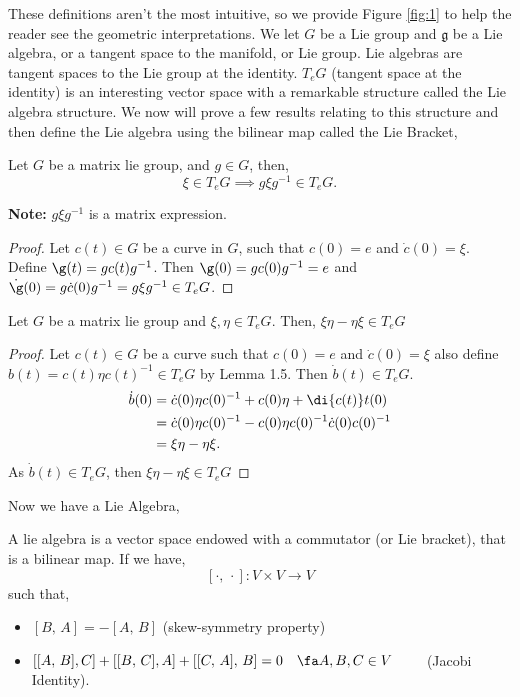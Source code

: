 \noindent
These definitions aren't the most intuitive, so we provide Figure \ref{fig:1} to help the reader see the geometric interpretations. We let $G$ be a Lie group and $\mathfrak{g}$ be a Lie algebra, or a tangent space to the manifold, or Lie group. Lie algebras are tangent spaces to the Lie group at the identity. $T_e G$ (tangent space at the identity) is an interesting vector space with a remarkable structure called the Lie algebra structure. We now will prove a few results relating to this structure and then define the Lie algebra using the bilinear map called the Lie Bracket,

\begin{nlemma}\label{lemma:comm}
  Let $G$ be a matrix lie group, and $g \in G$, then,
  $$ \xi \in T_eG \implies g\xi g^{-1} \in T_eG. $$
\end{nlemma}
\noindent
\textbf{Note:} $g \xi g^{-1}$ is a matrix expression.\\

\begin{proof}
  Let $c(t) \in G$ be a curve in $G$, such that $c(0) = e$ and $\dot c (0) = \xi$. Define $\g (t) = gc(t)g^{-1}$. Then $\g(0) = g c(0) g^{-1} = e$ and $\dot\g (0) = g \dot c (0) g^{-1} = g\xi g^{-1} \in T_e G$.
\end{proof}

\begin{nprop}
  Let $G$ be a matrix lie group and $\xi, \eta \in T_eG$. Then, $\xi\eta - \eta\xi \in T_eG$
\end{nprop}
\begin{proof}
  Let $c(t) \in G$ be a curve such that $c(0) = e$ and $\dot c(0) = \xi$ also define $b(t) = c(t)\eta c(t)^{-1} \in T_eG$ by Lemma 1.5. Then $\dot b(t) \in T_eG$.
  \begin{align*}
    \dot b(0) &= \dot c(0)\eta c(0)^{-1} + c(0)\eta + \di {c(t)} t (0)\\
    &= \dot c(0)\eta c(0)^{-1} - c(0)\eta c(0)^{-1}\dot c(0) c(0)^{-1}\\
    &= \xi \eta - \eta\xi.
  \end{align*}
  As $\dot b(t) \in T_eG$, then $\xi \eta - \eta\xi \in T_eG$
\end{proof}

\noindent
Now we have a Lie Algebra,
\begin{ndefi}
  A lie algebra is a vector space endowed with a {commutator }(or Lie bracket), that is a bilinear map. If we have,
  $$ [\cdot,\, \cdot] : V \times V \to V $$
  such that,
  \begin{itemize}
    \item $[B,\, A] = - [A,\, B]$ (skew-symmetry property)
    \item $[[A,\, B], C] + [[B,\, C], A] + [[C,\, A],\, B] = 0 \quad \fa A, B, C \in V \qquad$ (Jacobi Identity).
  \end{itemize}
\end{ndefi}

